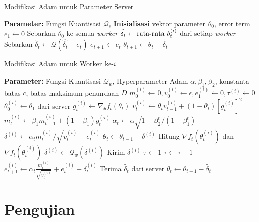 \begin{algorithm}[H]
  \caption{Modifikasi Adam untuk Parameter Server}\label{myadam_server}
  \begin{algorithmic}[1]
    \State \textbf{Parameter:} Fungsi Kuantisasi $\mathcal{Q}_s$
    \State \textbf{Inisialisasi} vektor parameter $\theta_0$, error term $e_1 \gets 0$
    \State Sebarkan $\theta_0$ ke semua \textit{worker}
    \State $\hat{\delta_t} \gets \textnormal{rata-rata } \delta_t^{(i)}$ dari setiap \textit{worker}
    \State Sebarkan $\tilde{\delta_t} \gets \mathcal{Q}(\hat{\delta_t} + e_t)$
    \State $e_{t+1} \gets e_{t}$
    \State $\theta_{t+1} \gets \theta_t - \tilde{\delta_t}$
    \EndFor
  \end{algorithmic}
\end{algorithm}

\begin{algorithm}[H]
  \caption{Modifikasi Adam untuk Worker ke-$i$}\label{myadam_worker}
  \begin{algorithmic}[1]
    \State \textbf{Parameter:} Fungsi Kuantisasi $\mathcal{Q}_w$, Hyperparameter Adam $\alpha, \beta_1, \beta_2$, konstanta batas $c$, batas maksimum penundaan $D$
    \State $m_0^{(i)} \gets 0, v_0^{(i)} \gets \epsilon, e_1^{(i)} \gets 0, \tau^{(i)} \gets 0$
    \State $\theta^{(i)}_0 \gets \theta_1$ dari server
    \State $g_t^{(i)} \gets \nabla_\theta f_t(\theta_{t})$
    \State $v_t^{(i)} \gets \theta_t v_{t-1}^{(i)} + (1-\theta_t)[g_t^{(i)}]^2$
    \State $m_t^{(i)} \gets \beta_1 m_{t-1}^{(i)} + (1-\beta_1)g_t^{(i)}$
    \State $\alpha_t \gets \alpha \sqrt{1-\beta_2^t}/(1-\beta_1^t)$
    \State $\delta^{(i)} \gets \alpha_t m_t^{(i)}/\sqrt{v_t^{(i)}}+e_t^{(i)}$
    \State $\theta_t \gets \theta_{t-1} - \delta^{(i)}$
    \State Hitung $\nabla f_t(\theta^{(i)}_{t})$ dan $\nabla f_t(\theta^{(i)}_{t-\tau})$
    \State $\delta^{(i)} \gets \mathcal{Q}_w(\delta^{(i)})$
    \State Kirim $\delta^{(i)}$
    \State $\tau \gets 1$
    \Else
    \State $\tau \gets \tau + 1$
    \EndIf
    \State $e_{t+1}^{(i)} \gets \alpha_t \frac{m_t^{(i)}}{\sqrt{v_t^{(i)}}} + e_t^{(i)} - \delta_t^{(i)}$
    \State Terima $\tilde{\delta_t}$ dari server
    \State $\theta_{t} \gets \theta_{t-1} - \tilde{\delta_t}$
    \EndFor
  \end{algorithmic}
\end{algorithm}

\section{Pengujian}
